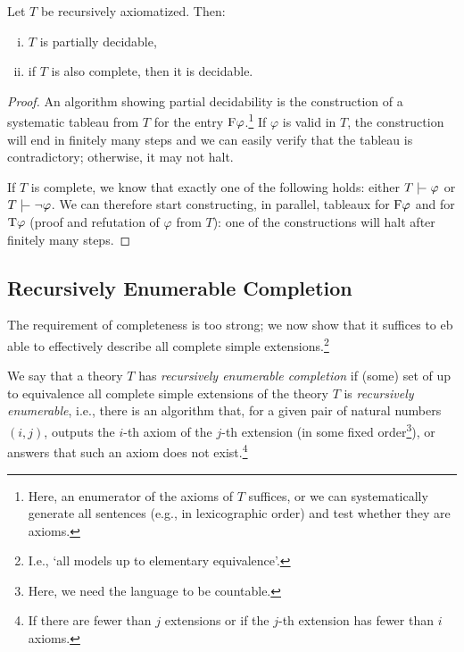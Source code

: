 \begin{proposition}
    Let $T$ be recursively axiomatized. Then:
    \begin{enumerate}[(i)]
        \item $T$ is partially decidable,
        \item if $T$ is also complete, then it is decidable.
    \end{enumerate}
\end{proposition}
\begin{proof}
An algorithm showing partial decidability is the construction of a systematic tableau from $T$ for the entry $\mathrm{F} \varphi$.\footnote{Here, an enumerator of the axioms of $T$ suffices, or we can systematically generate all sentences (e.g., in lexicographic order) and test whether they are axioms.} If $\varphi$ is valid in $T$, the construction will end in finitely many steps and we can easily verify that the tableau is contradictory; otherwise, it may not halt.

If $T$ is complete, we know that exactly one of the following holds: either $T \proves \varphi$ or $T \proves \neg \varphi$. We can therefore start constructing, in parallel, tableaux for $\mathrm{F} \varphi$ and for $\mathrm{T} \varphi$ (proof and refutation of $\varphi$ from $T$): one of the constructions will halt after finitely many steps.
\end{proof}


\subsection{Recursively Enumerable Completion}

The requirement of completeness is too strong; we now show that it suffices to eb able to effectively describe all complete simple extensions.\footnote{I.e., `all models up to elementary equivalence'.}

\begin{definition}
We say that a theory $T$ has \emph{recursively enumerable completion} if (some) set of up to equivalence all complete simple extensions of the theory $T$ is \emph{recursively enumerable}, i.e., there is an algorithm that, for a given pair of natural numbers $(i,j)$, outputs the $i$-th axiom of the $j$-th extension (in some fixed order\footnote{Here, we need the language to be countable.}), or answers that such an axiom does not exist.\footnote{If there are fewer than $j$ extensions or if the $j$-th extension has fewer than $i$ axioms.}
\end{definition}

